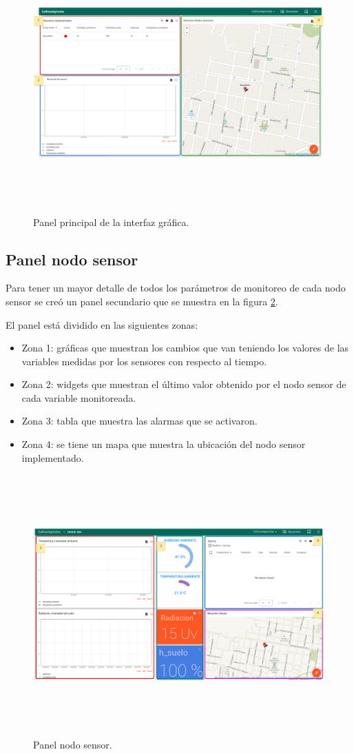 \begin{figure}[h]
  \centering
	\includegraphics[width=\textwidth, height=10cm]{./Figures/panel_principal_editado.png}
  \caption{Panel principal de la interfaz gráfica.}
	\label{fig:Panel principal}
\end{figure}

\clearpage
\subsection{Panel nodo sensor} 

Para tener un mayor detalle de todos los parámetros de monitoreo de cada nodo sensor se creó un panel secundario que se muestra en la figura \ref{fig:Panel nodo sensor}.

El panel está dividido en las siguientes zonas:
\begin{itemize}
  \item Zona 1: gráficas que muestran los cambios que van teniendo los valores de las variables medidas por los sensores con respecto al tiempo.
  \item Zona 2: widgets que muestran el último valor obtenido por el nodo sensor de cada variable monitoreada.
  \item Zona 3: tabla que muestra las alarmas que se activaron. 
  \item Zona 4: se tiene un mapa que muestra la ubicación del nodo sensor implementado.
\end{itemize}

\begin{figure}[h!]
  \centering
	\includegraphics[width=\textwidth, height=10cm]{./Figures/panel_nodosensor_editado.png}
  \caption{Panel nodo sensor.}
	\label{fig:Panel nodo sensor}
\end{figure}